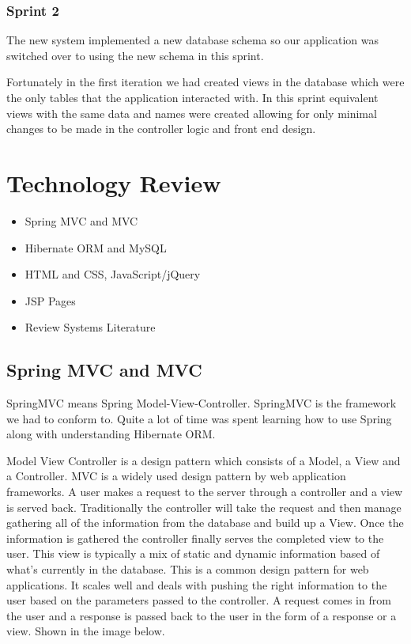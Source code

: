 \subsection{Sprint 2}
The new system implemented a new database schema so our application was switched over to using the new schema in this sprint. 

Fortunately in the first iteration we had created views in the database which were the only tables that the application interacted with. In this sprint equivalent views with the same data and names were created allowing for only minimal changes to be made in the controller logic and front end design.
 
\chapter{Technology Review}

\begin{itemize}	
	\item Spring MVC and MVC	
	\item Hibernate ORM and MySQL
	\item HTML and CSS, JavaScript/jQuery
	\item JSP Pages
	\item Review Systems Literature
\end{itemize}

\section{Spring MVC and MVC}

SpringMVC means Spring Model-View-Controller. SpringMVC is the framework we had to conform to. Quite a lot of time was spent learning how to use Spring along with understanding Hibernate ORM.

Model View Controller is a design pattern which consists of a Model, a View and a Controller. MVC is a widely used design pattern by web application frameworks. A user makes a request to the server through a controller and a view is served back. Traditionally the controller will take the request and then manage gathering all of the information from the database and build up a View. Once the information is gathered the controller finally serves the completed view to the user. This view is typically a mix of static and dynamic information based of what's currently in the database. This is a common design pattern for web applications. It scales well and deals with pushing the right information to the user based on the parameters passed to the controller. A request comes in from the user and a response is passed back to the user in the form of a response or a view. Shown in the image below.

